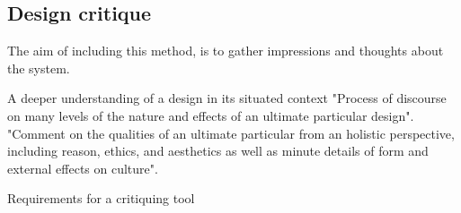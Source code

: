 \subsection{Design critique}
The aim of including this method, is to gather impressions and thoughts about the system. 

A deeper understanding of a design in its situated context \cite{Frauenberger2013}
"Process of discourse on many levels of the nature and effects of an ultimate particular design". "Comment on the qualities of an ultimate particular from an holistic perspective, including reason, ethics, and aesthetics as well as minute details of form and external effects on culture".\cite{Blevis2007}

Requirements for a critiquing tool


